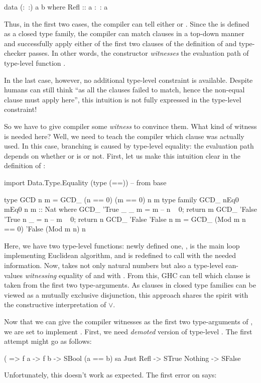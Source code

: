 \documentclass[demotion-paper.tex]{subfiles}
\begin{document}
\begin{code}
data (:~:) a b where
  Refl :: a :~: a
\end{code}

Thus, in the first two cases, the compiler can tell either  or .
Since the  is defined as a closed type family, the compiler can match clauses in a top-down manner and successfully apply either of the first two clauses of the definition of  and type-checker passes.
In other words, the constructor  \emph{witnesses} the evaluation path of type-level function .

In the last case, however, no additional type-level constraint is available.
Despite humans can still think ``as all the  clauses failed to match, hence the non-equal clause must apply here'', this intuition is not fully expressed in the type-level constraint!

So we have to give compiler some \emph{witness} to convince them.
What kind of witness is needed here?
Well, we need to teach the compiler which clause was actually used.
In this case, branching is caused by type-level equality: the evaluation path depends on whether  or  is  or not.
First, let us make this intuition clear in the definition of :

\begin{code}
import Data.Type.Equality (type (==)) -- from base

type GCD n m = GCD_ (n == 0) (m == 0) n m
type family GCD_ nEq0 mEq0 n m :: Nat where
  GCD_ 'True  _      _ m = m   -- n ~ 0; return m
  GCD_ 'False 'True  n _ = n   -- m ~ 0; return n
  GCD_ 'False 'False n m = 
    GCD_ (Mod m n == 0) 'False (Mod m n) n
\end{code}

Here, we have two type-level functions: newly defined one, , is the main loop implementing Euclidean algorithm, and
 is redefined to call  with the needed information.
Now,  takes not only natural numbers but also a type-level ean-values \emph{witnessing} equality of  and  with .
From this, GHC can tell which clause is taken from the first two type-arguments.
As clauses in closed type families can be viewed as a mutually exclusive disjunction, this approach shares the spirit with the constructive interpretation of $\vee$.

Now that we can give the compiler witnesses as the first two type-arguments of , we are set to implement .
First, we need \emph{demoted} version of type-level \hask{(==)}.
The first attempt might go as follows:
\begin{code}
(%
      => f a -> f b -> SBool (a == b)
sa %
  Just Refl -> STrue
  Nothing -> SFalse
\end{code}
Unfortunately, this doesn't work as expected.
The first error on  says:
\end{document}
